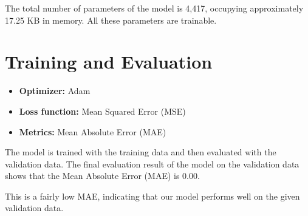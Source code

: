 \documentclass{report}
\begin{document}
The total number of parameters of the model is 4,417, occupying approximately 17.25 KB in memory. All these parameters are trainable.

\section{Training and Evaluation}

\begin{itemize}
    \item \textbf{Optimizer:} Adam
    \item \textbf{Loss function:} Mean Squared Error (MSE)
    \item \textbf{Metrics:} Mean Absolute Error (MAE)
\end{itemize}

The model is trained with the training data and then evaluated with the validation data. The final evaluation result of the model on the validation data shows that the Mean Absolute Error (MAE) is 0.00.

This is a fairly low MAE, indicating that our model performs well on the given validation data.
\end{document}
